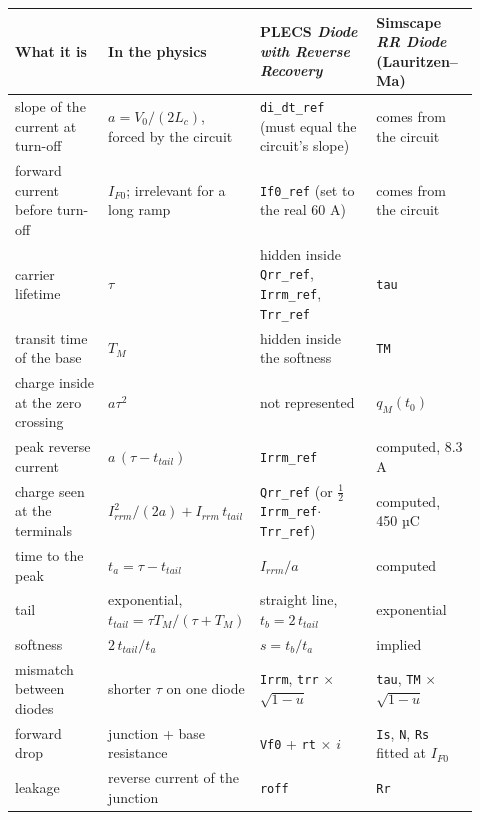 \documentclass[11pt,a4paper,numbers=noenddot]{scrartcl}
\begin{document}
\begin{onehalfspace}
{\small\singlespacing
\begin{longtable}[]{@{}>{\raggedright\arraybackslash}p{0.2\linewidth}>{\raggedright\arraybackslash}p{0.25\linewidth}>{\raggedright\arraybackslash}p{0.25\linewidth}>{\raggedright\arraybackslash}p{0.22\linewidth}@{}}
\toprule\noalign{}
What it is & In the physics & PLECS \emph{Diode with Reverse Recovery} & Simscape \emph{RR Diode} (Lauritzen--Ma) \\
\midrule\noalign{}
\endhead
\bottomrule\noalign{}
\endlastfoot
slope of the current at turn-off & \(a = V_0/(2L_c)\), forced by the circuit & \texttt{di\_dt\_ref} (must equal the circuit's slope) & comes from the circuit \\
forward current before turn-off & \(I_{F0}\); irrelevant for a long ramp & \texttt{If0\_ref} (set to the real 60 A) & comes from the circuit \\
carrier lifetime & \(\tau\) & hidden inside \texttt{Qrr\_ref}, \texttt{Irrm\_ref}, \texttt{Trr\_ref} & \texttt{tau} \\
transit time of the base & \(T_M\) & hidden inside the softness & \texttt{TM} \\
charge inside at the zero crossing & \(a\tau^2\) & not represented & \(q_M(t_0)\) \\
peak reverse current & \(a\,(\tau - t_{tail})\) & \texttt{Irrm\_ref} & computed, 8.3 A \\
charge seen at the terminals & \(I_{rrm}^2/(2a) + I_{rrm}\,t_{tail}\) & \texttt{Qrr\_ref} (or \(\tfrac{1}{2}\)\texttt{Irrm\_ref}\(\cdot\)\texttt{Trr\_ref}) & computed, 450 µC \\
time to the peak & \(t_a = \tau - t_{tail}\) & \(I_{rrm}/a\) & computed \\
tail & exponential, \(t_{tail} = \tau T_M/(\tau + T_M)\) & straight line, \(t_b = 2\,t_{tail}\) & exponential \\
softness & \(2\,t_{tail}/t_a\) & \(s = t_b/t_a\) & implied \\
mismatch between diodes & shorter \(\tau\) on one diode & \texttt{Irrm}, \texttt{trr} \(\times\) \(\sqrt{1-u}\) & \texttt{tau}, \texttt{TM} \(\times\) \(\sqrt{1-u}\) \\
forward drop & junction + base resistance & \texttt{Vf0} + \texttt{rt} \(\times\) \(i\) & \texttt{Is}, \texttt{N}, \texttt{Rs} fitted at \(I_{F0}\) \\
leakage & reverse current of the junction & \texttt{roff} & \texttt{Rr} \\
\end{longtable}
}
\addtocounter{table}{-1}%


\end{onehalfspace}
\end{document}
